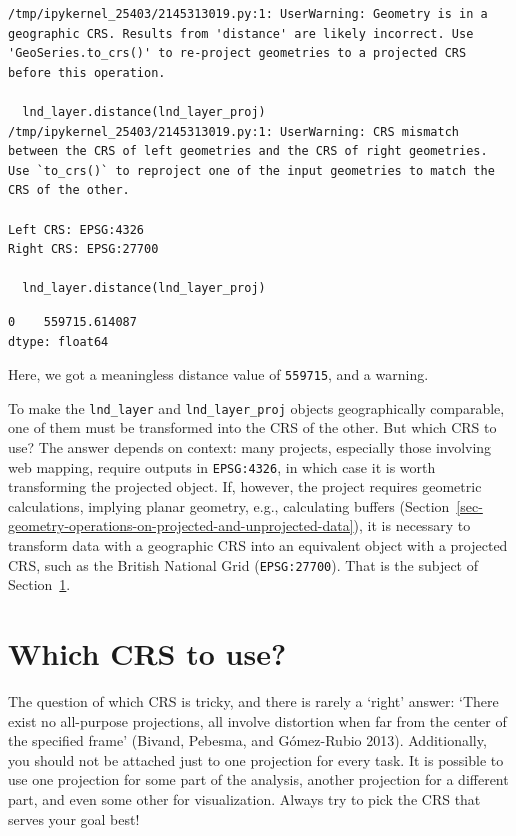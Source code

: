 \documentclass[
  letterpaper,
]{krantz}
\begin{document}
\begin{verbatim}
/tmp/ipykernel_25403/2145313019.py:1: UserWarning: Geometry is in a geographic CRS. Results from 'distance' are likely incorrect. Use 'GeoSeries.to_crs()' to re-project geometries to a projected CRS before this operation.

  lnd_layer.distance(lnd_layer_proj)
/tmp/ipykernel_25403/2145313019.py:1: UserWarning: CRS mismatch between the CRS of left geometries and the CRS of right geometries.
Use `to_crs()` to reproject one of the input geometries to match the CRS of the other.

Left CRS: EPSG:4326
Right CRS: EPSG:27700

  lnd_layer.distance(lnd_layer_proj)
\end{verbatim}

\begin{verbatim}
0    559715.614087
dtype: float64
\end{verbatim}

Here, we got a meaningless distance value of \texttt{559715}, and a
warning.

To make the \texttt{lnd\_layer} and \texttt{lnd\_layer\_proj} objects
geographically comparable, one of them must be transformed into the CRS
of the other. But which CRS to use? The answer depends on context: many
projects, especially those involving web mapping, require outputs in
\texttt{EPSG:4326}, in which case it is worth transforming the projected
object. If, however, the project requires geometric calculations,
implying planar geometry, e.g., calculating buffers
(Section~\ref{sec-geometry-operations-on-projected-and-unprojected-data}),
it is necessary to transform data with a geographic CRS into an
equivalent object with a projected CRS, such as the British National
Grid (\texttt{EPSG:27700}). That is the subject of
Section~\ref{sec-which-crs-to-use}.

\section{Which CRS to use?}\label{sec-which-crs-to-use}

The question of which CRS is tricky, and there is rarely a `right'
answer: `There exist no all-purpose projections, all involve distortion
when far from the center of the specified frame' (Bivand, Pebesma, and
Gómez-Rubio 2013). Additionally, you should not be attached just to one
projection for every task. It is possible to use one projection for some
part of the analysis, another projection for a different part, and even
some other for visualization. Always try to pick the CRS that serves
your goal best!
\end{document}
